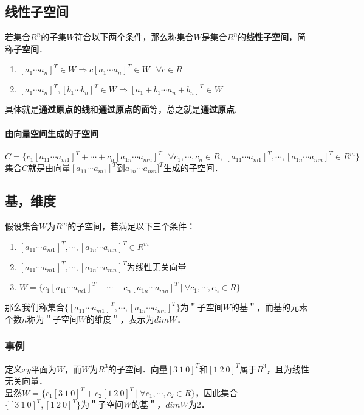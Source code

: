 \documentclass[12pt]{article}
\begin{document}
\begin{CJK}{UTF8}{gbsn}
\section{线性子空间}
若集合$R^n$的子集$W$符合以下两个条件，那么称集合$W$是集合$R^n$的\textbf{线性子空间}，简称\textbf{子空间}．
\begin{enumerate}
\item $[a_1\cdots a_n]^T\in W \Rightarrow c[a_1\cdots a_n]^T\in W\ |\ \forall c \in R$
\item $[a_1\cdots a_n]^T, [b_1\cdots b_n]^T\in W \Rightarrow [a_1+b_1\cdots a_n+b_n]^T\in W$
\end{enumerate}
具体就是\textbf{通过原点的线}和\textbf{通过原点的面}等，总之就是\textbf{通过原点}.
\paragraph{由向量空间生成的子空间}
\begin{equation}
C=\lbrace c_1[a_{11}\cdots a_{m1}]^T + \cdots + c_n[a_{1n}\cdots a_{mn}]^T\ |\ \forall c_1,\cdots,c_n \in R,\ [a_{11}\cdots a_{m1}]^T,\cdots,[a_{1n}\cdots a_{mn}]^T \in R^m\rbrace
\end{equation}
集合$C$就是由向量$[a_{11}\cdots a_{m1}]^T$到$a_{1n}\cdots a_{mn}]^T$生成的子空间．
\subsection{基，维度}
假设集合$W$为$R^m$的子空间，若满足以下三个条件：
\begin{enumerate}
\item $[a_{11} \cdots a_{m1}]^T, \cdots, [a_{1n} \cdots a_{mn}]^T \in R^m$
\item $[a_{11} \cdots a_{m1}]^T, \cdots, [a_{1n} \cdots a_{mn}]^T$为线性无关向量
\item $W=\lbrace c_1[a_{11} \cdots a_{m1}]^T + \cdots + c_n[a_{1n} \cdots a_{mn}]^T\ |\ \forall c_1,\cdots,c_n\in R \rbrace$
\end{enumerate}
那么我们称集合$\lbrace [a_{11} \cdots a_{m1}]^T, \cdots ,[a_{1n} \cdots a_{mn}]^T \rbrace$为＂子空间$W$的基＂，而基的元素个数$n$称为＂子空间$W$的维度＂，表示为$dimW$．
\subsubsection{事例}
定义$xy$平面为$W$，而$W$为$R^3$的子空间．向量$[3\ 1\ 0]^T$和$[1\ 2\ 0]^T$属于$R^3$，且为线性无关向量．\\显然$W=\lbrace c_1[3\ 1\ 0]^T  + c_2[1\ 2\ 0]^T\ |\ \forall c_1,\cdots,c_2\in R \rbrace$，因此集合$\lbrace [3\ 1\ 0]^T, [1\ 2\ 0]^T \rbrace$为＂子空间$W$的基＂，$dimW$为$2$．



\end{CJK}
\end{document}
